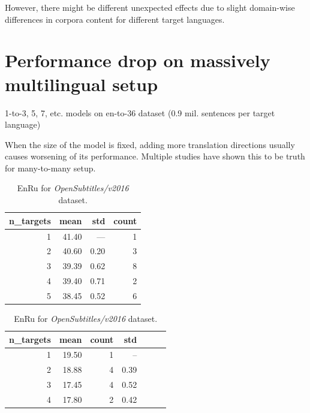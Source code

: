 However, there might be different unexpected effects due to slight domain-wise differences
in corpora content for different target languages.


\section{Performance drop on massively multilingual setup}
1-to-3, 5, 7, etc. models on en-to-36 dataset (0.9 mil. sentences per target language)

When the size of the model is fixed, adding more translation directions usually causes
worsening of its performance. Multiple studies have shown this to be truth for
many-to-many setup.



\begin{table}[h!]
\begin{subtable}[t]{0.45\linewidth}
	\centering
	\begin{tabular}{rrrr}
	\toprule
	n\_targets &   mean &   std & count \\
	\midrule
	         1 &  41.40 &  ---  &   1 \\
	         2 &  40.60 &  0.20 &   3 \\
	         3 &  39.39 &  0.62 &   8 \\
	         4 &  39.40 &  0.71 &   2 \\
	         5 &  38.45 &  0.52 &   6 \\
	\bottomrule
	\end{tabular}

	\caption{
		En\to{}Bg for \emph{Europarl/v7} dataset.
		}
	\label{tab:bg/Europarl/v7}
\end{subtable}
\begin{subtable}[t]{0.45\linewidth}
	\centering
	\begin{tabular}{rrrrrrr}
	\toprule
	n\_targets & mean & count & std \\
	\midrule
	        1 &     19.50 &    1 &   --  \\
	        2 &     18.88 &    4 &  0.39 \\
	        3 &     17.45 &    4 &  0.52 \\
	        4 &     17.80 &    2 &  0.42 \\
	\bottomrule
	\end{tabular}
	
	\caption{
		En\to{}Ru for \emph{OpenSubtitles/v2016} dataset.
		}
	\label{ table:ru/OpenSubtitles/v2016 }
\end{subtable}
\end{table}




